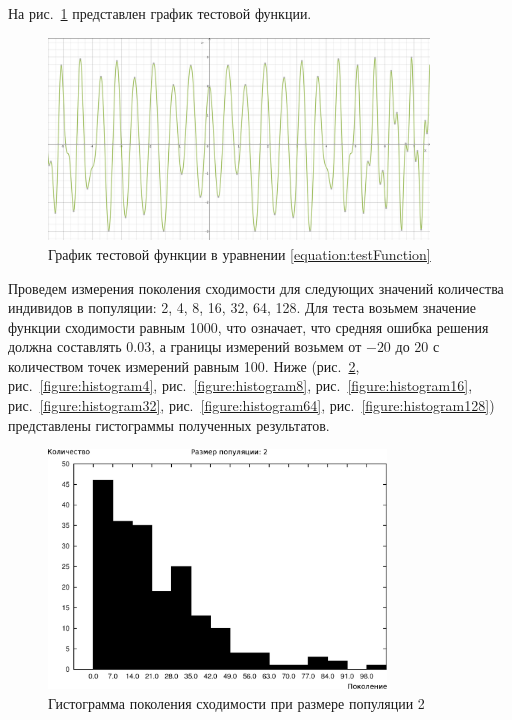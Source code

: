 На рис.~\ref{figure:testFunction} представлен график тестовой функции.

\begin{figure}[h!]
\centering
\includegraphics[width=0.9\textwidth]{science/test_function}
\caption{График тестовой функции в уравнении \ref{equation:testFunction}}
\label{figure:testFunction}
\end{figure}

Проведем измерения поколения сходимости для следующих значений количества индивидов в популяции: 2, 4, 8, 16, 32, 64, 128. Для теста возьмем значение функции сходимости равным 1000, что означает, что средняя ошибка решения должна составлять 0.03, а границы измерений возьмем от $-20$ до $20$ с количеством точек измерений равным 100. Ниже (рис.~\ref{figure:histogram2}, рис.~\ref{figure:histogram4}, рис.~\ref{figure:histogram8}, рис.~\ref{figure:histogram16}, рис.~\ref{figure:histogram32}, рис.~\ref{figure:histogram64}, рис.~\ref{figure:histogram128}) представлены гистограммы полученных результатов.

\begin{figure}[h!]
\centering
\includegraphics[width=0.8\textwidth]{science/histogram2}
\caption{Гистограмма поколения сходимости при размере популяции 2}
\label{figure:histogram2}
\end{figure}

